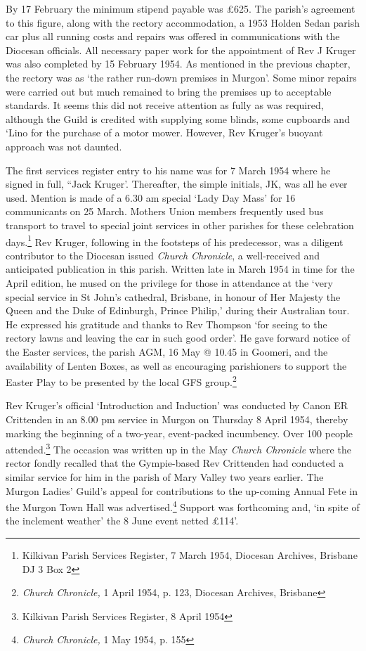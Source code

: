By 17 February the minimum stipend payable was \pounds625. The parish's agreement to this figure, along with the rectory accommodation, a 1953 Holden Sedan parish car plus all running costs and repairs was offered in communications with the Diocesan officials. All necessary paper work for the appointment of Rev J Kruger was also completed by 15 February 1954. As mentioned in the previous chapter, the rectory was as `the rather run-down premises in Murgon'. Some minor repairs were carried out but much remained to bring the premises up to acceptable standards. It seems this did not receive attention as fully as was required, although the Guild is credited with supplying some blinds, some cupboards and `Lino for the purchase of a motor mower. However, Rev Kruger's buoyant approach was not daunted.



The first services register entry to his name was for 7 March 1954 where he signed in full, ``Jack Kruger'. Thereafter, the simple initials, JK, was all he ever used. Mention is made of a 6.30 am special `Lady Day Mass' for 16 communicants on 25 March. Mothers Union members frequently used bus transport to travel to special joint services in other parishes for these celebration days.\footnote{Kilkivan Parish Services Register, 7 March 1954, Diocesan Archives, Brisbane DJ 3 Box 2} Rev Kruger, following in the footsteps of his predecessor, was a diligent contributor to the Diocesan issued \emph{Church Chronicle}, a well-received and anticipated publication in this parish. Written late in March 1954 in time for the April edition, he mused on the privilege for those in attendance at the `very special service in St John's cathedral, Brisbane, in honour of Her Majesty the Queen and the Duke of Edinburgh, Prince Philip,' during their Australian tour. He expressed his gratitude and thanks to Rev Thompson `for seeing to the rectory lawns and leaving the car in such good order'. He gave forward notice of the Easter services, the parish AGM, 16 May @ 10.45 in Goomeri, and the availability of Lenten Boxes, as well as encouraging parishioners to support the Easter Play to be presented by the local GFS group.\footnote{\emph{Church Chronicle,} 1 April 1954, p. 123, Diocesan Archives, Brisbane}


Rev Kruger's official `Introduction and Induction' was conducted by Canon ER Crittenden in an 8.00 pm service in Murgon on Thursday 8 April 1954, thereby marking the beginning of a two-year, event-packed incumbency. Over 100 people attended.\footnote{Kilkivan Parish Services Register, 8 April 1954} The occasion was written up in the May \emph{Church Chronicle} where the rector fondly recalled that the Gympie-based Rev Crittenden had conducted a similar service for him in the parish of Mary Valley two years earlier. The Murgon Ladies' Guild's appeal for contributions to the up-coming Annual Fete in the Murgon Town Hall was advertised.\footnote{\emph{Church Chronicle,} 1 May 1954, p. 155} Support was forthcoming and, `in spite of the inclement weather' the 8 June event netted \pounds114'.


